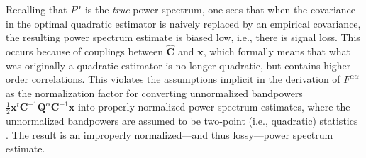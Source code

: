 \documentclass[12pt,preprint]{aastex}
\newcommand{\x}{\mathbf{x}}
\newcommand{\C}{\mathbf{C}}
\newcommand{\Q}{\mathbf{Q}}
\begin{document}
Recalling that $P^\alpha$ is the \emph{true} power spectrum, one sees that when the covariance in the optimal quadratic estimator is naively replaced by an empirical covariance, the resulting power spectrum estimate is biased low, i.e., there is signal loss. This occurs because of couplings between $\widehat{\C}$ and $\x$, which formally means that what was originally a quadratic estimator is no longer quadratic, but contains higher-order correlations. This violates the assumptions implicit in the derivation of $F^{\alpha \alpha}$ as the normalization factor for converting unnormalized bandpowers $\frac{1}{2} \x^t \C^{-1} \Q^{\alpha} \C^{-1} \x$ into properly normalized power spectrum estimates, where the unnormalized bandpowers are assumed to be two-point (i.e., quadratic) statistics \citep{liu_tegmark2011}. The result is an improperly normalized---and thus lossy---power spectrum estimate.



\end{document}
